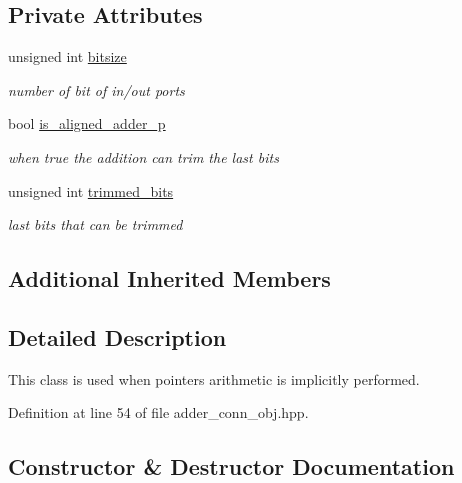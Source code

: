 \subsection*{Private Attributes}
\begin{DoxyCompactItemize}
\item 
unsigned int \hyperlink{classadder__conn__obj_a5a0c72d0853ca2054d64ab898ef532ea}{bitsize}
\begin{DoxyCompactList}\small\item\em number of bit of in/out ports \end{DoxyCompactList}\item 
bool \hyperlink{classadder__conn__obj_a0dda9606f4dba1377d28d01ef3343c8c}{is\+\_\+aligned\+\_\+adder\+\_\+p}
\begin{DoxyCompactList}\small\item\em when true the addition can trim the last bits \end{DoxyCompactList}\item 
unsigned int \hyperlink{classadder__conn__obj_adeafa67ddf9e45946ebb0043c8cbef28}{trimmed\+\_\+bits}
\begin{DoxyCompactList}\small\item\em last bits that can be trimmed \end{DoxyCompactList}\end{DoxyCompactItemize}
\subsection*{Additional Inherited Members}


\subsection{Detailed Description}
This class is used when pointers arithmetic is implicitly performed. 

Definition at line 54 of file adder\+\_\+conn\+\_\+obj.\+hpp.



\subsection{Constructor \& Destructor Documentation}
\mbox{\label{classadder__conn__obj_afcde492f8237c3aec85536b4e85276b4}} 
